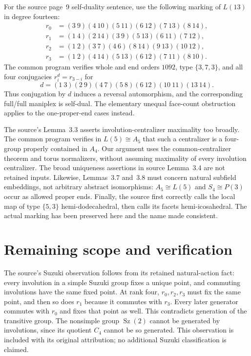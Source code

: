 \documentclass[11pt]{article}
\begin{document}
For the source page~9 self-duality sentence, use the following marking
of $L(13)$ in degree fourteen:
\[
\begin{aligned}
r_0&=(3\ 9)(4\ 10)(5\ 11)(6\ 12)(7\ 13)(8\ 14),\\
r_1&=(1\ 4)(2\ 14)(3\ 9)(5\ 13)(6\ 11)(7\ 12),\\
r_2&=(1\ 2)(3\ 7)(4\ 6)(8\ 14)(9\ 13)(10\ 12),\\
r_3&=(1\ 2)(4\ 14)(5\ 13)(6\ 12)(7\ 11)(8\ 10).
\end{aligned}
\]
The common program verifies whole and end orders $1092$, type
$\{3,7,3\}$, and all four conjugacies $r_i^d=r_{3-i}$ for
\[
 d=(1\ 3)(2\ 9)(4\ 7)(5\ 8)(6\ 12)(10\ 11)(13\ 14).
\]
Thus conjugation by $d$ induces a reversal automorphism, and the
corresponding full/full maniplex is self-dual. The elementary unequal
face-count obstruction applies to the one-proper-end cases instead.

The source's Lemma~3.3 asserts involution-centralizer maximality too
broadly. The common program verifies in $L(5)\cong A_5$ that such a
centralizer is a four-group properly contained in $A_4$. Our argument
uses the common-centralizer theorem and torus normalizers, without
assuming maximality of every involution centralizer. The broad
uniqueness assertions in source Lemma~3.4 are not retained inputs.
Likewise, Lemmas~3.7 and~3.8 must concern natural subfield embeddings,
not arbitrary abstract isomorphisms: $A_5\cong L(5)$ and
$S_4\cong P(3)$ occur as allowed proper ends. Finally, the source first
correctly calls the local map of type $\{5,3\}$ hemi-dodecahedral,
then calls its facets hemi-icosahedral. The actual marking has been
preserved here and the name made consistent.

\section{Remaining scope and verification}
The source's Suzuki observation follows from its retained natural-action
fact: every involution in a simple Suzuki group fixes a unique point,
and commuting involutions have the same fixed point. At rank four,
$r_0,r_2,r_3$ must fix the same point, and then so does $r_1$ because
it commutes with $r_3$. Every later generator commutes with $r_0$ and
fixes that point as well. This contradicts generation of the transitive
group. The nonsimple group $\operatorname{Sz}(2)$ cannot be generated
by involutions, since its quotient $C_4$ cannot be so generated.
This observation is included with its original attribution; no additional
Suzuki classification is claimed.
\end{document}
